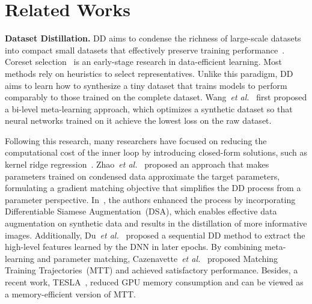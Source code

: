 \section{Related Works}
\noindent \textbf{Dataset Distillation.} DD aims to condense the richness of large-scale datasets into compact small datasets that effectively preserve training performance~\cite{yu2023dataset}.
Coreset selection~\cite{du2024sequential} is an early-stage research in data-efficient learning. Most methods rely on heuristics to select representatives. 
Unlike this paradigm, DD~\cite{wang2018dataset} aims to learn how to synthesize a tiny dataset that trains models to perform comparably to those trained on the complete dataset. Wang~\textit{et al.}~\cite{wang2018dataset} first proposed a bi-level meta-learning approach, which optimizes a synthetic dataset so that neural networks trained on it achieve the lowest loss on the raw dataset.

Following this research, many researchers have focused on reducing the computational cost of the inner loop by introducing closed-form solutions, such as kernel ridge regression~\cite{loo2022efficient,chenprovable,xu2023kernel}. 
Zhao~\textit{et al.}~\cite{zhao2021dataset} proposed an approach that makes parameters trained on condensed data approximate the target parameters, formulating a gradient matching objective that simplifies the DD process from a parameter perspective. In~\cite{zhao2021datasetdsa}, the authors enhanced the process by incorporating Differentiable Siamese Augmentation~(DSA), which enables effective data augmentation on synthetic data and results in the distillation of more informative images. Additionally, Du~\textit{et al.}~\cite{du2024sequential} proposed a sequential DD method to extract the high-level features learned by the DNN in later epochs. 
By combining meta-learning and parameter matching, Cazenavette~\textit{et al.}~\cite{cazenavette2022dataset} proposed Matching Training Trajectories~(MTT) and achieved satisfactory performance. Besides, a recent work, TESLA~\cite{cui2023scaling}, reduced GPU memory consumption and can be viewed as a memory-efficient version of MTT. 

